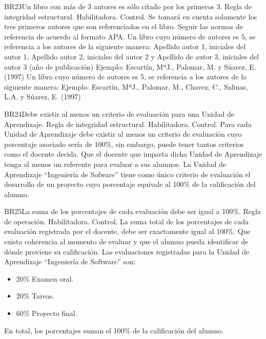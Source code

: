 \begin{BussinesRule}{BR23}{Un libro con más de 3 autores es sólo citado por los primeros 3.}
    \BRitem[Tipo:] Regla de integridad estructural.
    \BRitem[Clase:] Habilitadora.
    \BRitem[Nivel:] Control.
    \BRitem[Descripción:] Se tomará en cuenta solamente los tres primeros autores que son referenciados en el libro.
    \BRitem[Motivación:] Seguir las normas de referencia de acuerdo al formato APA.
     Un libro cuyo número de autores es 5, se referencia a los autores de la siguiente manera:
    Apellido autor 1, iniciales del autor 1, Apellido autor 2, iniciales del autor 2 y Apellido de autor 3, iniciales del autor 3 (año de publicación)
    Ejemplo: Escartín, MªJ., Palomar, M. y Súarez, E. (1997)
     Un libro cuyo número de autores es 5, se referencia a los autores de la siguiente manera:
    Ejemplo: Escartín, MªJ., Palomar, M., Chavez, C., Salinas, L.A. y Súarez, E. (1997)
\end{BussinesRule}
\begin{BussinesRule}{BR24}{Debe existir al menos un criterio de evaluación para una Unidad de Aprendizaje.}
    \BRitem[Tipo:] Regla de integridad estructural.
    \BRitem[Clase:] Habilitadora.
    \BRitem[Nivel:] Control.
    \BRitem[Descripción:] Para cada Unidad de Aprendizaje debe existir al menos un criterio de evaluación cuyo porcentaje asociado sería de 100\%, sin embargo, puede tener tantos criterios como el docente decida.
    \BRitem[Motivación:] Que el docente que imparta dicha Unidad de Aprendizaje tenga al menos un referente para evaluar a sus alumnos.
     La Unidad de Aprendizaje ``Ingeniería de Sofware'' tiene como único criterio de evaluación el desarrollo de un proyecto cuyo porcentaje equivale al 100\% de la calificación del alumno.
\end{BussinesRule}
\begin{BussinesRule}{BR25}{La suma de los porcentajes de cada evaluación debe ser igual a 100\%.}
    \BRitem[Tipo:] Regla de operación.
    \BRitem[Clase:] Habilitadora.
    \BRitem[Nivel:] Control.
    \BRitem[Descripción:] La suma total de los porcentajes de cada evaluación registrada por el docente, debe ser exactamente igual al 100\%.
    \BRitem[Motivación:] Que exista coherencia al momento de evaluar y que el alumno pueda identificar de dónde proviene su calificación.
     Las evaluaciones registradas para la Unidad de Aprendizaje ``Ingeniería de Software'' son:
        \begin{itemize}
            \item 20\% Examen oral.
            \item 20\% Tareas.
            \item 60\% Proyecto final.
        \end{itemize}
        En total, los porcentajes suman el 100\% de la calificación del alumno.
\end{BussinesRule}
